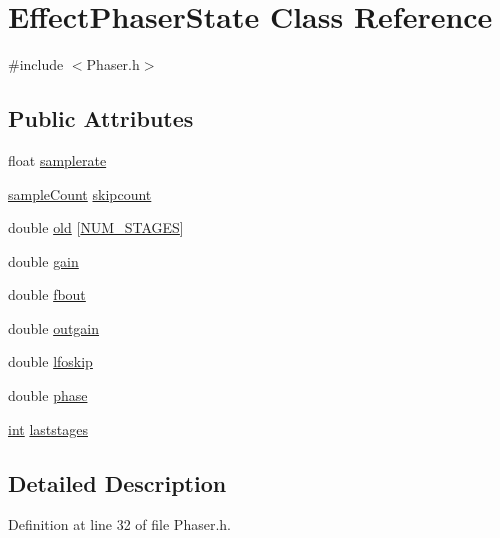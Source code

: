 \hypertarget{class_effect_phaser_state}{}\section{Effect\+Phaser\+State Class Reference}
\label{class_effect_phaser_state}


{\ttfamily \#include $<$Phaser.\+h$>$}

\subsection*{Public Attributes}
\begin{DoxyCompactItemize}
\item 
float \hyperlink{class_effect_phaser_state_adbc43c3b53f13bd9cefb34d169e82501}{samplerate}
\item 
\hyperlink{include_2audacity_2_types_8h_afa427e1f521ea5ec12d054e8bd4d0f71}{sample\+Count} \hyperlink{class_effect_phaser_state_af2fa2c3e284db5c72a080aaa42e46e03}{skipcount}
\item 
double \hyperlink{class_effect_phaser_state_ad68db3e9f0b8ead3a30ad93ae4c39473}{old} \mbox{[}\hyperlink{_phaser_8h_ad7a08c1ad332eab094ec8be457bce447}{N\+U\+M\+\_\+\+S\+T\+A\+G\+ES}\mbox{]}
\item 
double \hyperlink{class_effect_phaser_state_aae03ee826bbf579d4c0845c88c3ff37d}{gain}
\item 
double \hyperlink{class_effect_phaser_state_a7974d3b9f85d2f1fa25d88a6128c589e}{fbout}
\item 
double \hyperlink{class_effect_phaser_state_a424a4328c25aa8835c6b149f5c772fa9}{outgain}
\item 
double \hyperlink{class_effect_phaser_state_a443f58314ac5b40cda0ddf76db70e2a2}{lfoskip}
\item 
double \hyperlink{class_effect_phaser_state_aae650dfadb8d14b4cbc2cfa2348f2f19}{phase}
\item 
\hyperlink{xmltok_8h_a5a0d4a5641ce434f1d23533f2b2e6653}{int} \hyperlink{class_effect_phaser_state_a96e59907a263530a5906b8a7848cd896}{laststages}
\end{DoxyCompactItemize}


\subsection{Detailed Description}


Definition at line 32 of file Phaser.\+h.



